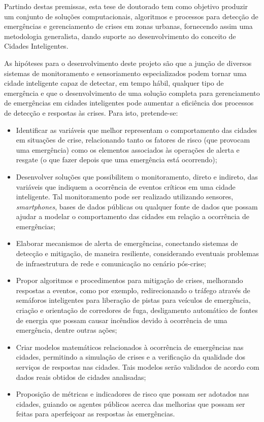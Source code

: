 \begin{refsection}
Partindo destas premissas, esta tese de doutorado tem como objetivo produzir um conjunto de soluções computacionais, algoritmos e processos para detecção de emergências e gerenciamento de crises em zonas urbanas, fornecendo assim uma metodologia generalista, dando suporte ao desenvolvimento do conceito de Cidades Inteligentes.

As hipóteses para o desenvolvimento deste projeto são que a junção de diversos sistemas de monitoramento e sensoriamento especializados podem tornar uma cidade inteligente capaz de detectar, em tempo hábil, qualquer tipo de emergência e que o desenvolvimento de uma solução completa para gerenciamento de emergências em cidades inteligentes pode aumentar a eficiência dos processos de detecção e respostas às crises. Para isto, pretende-se:

\begin{itemize}
  \item Identificar as variáveis que melhor representam o comportamento das cidades em situações de crise, relacionando tanto os fatores de risco (que provocam uma emergência) como os elementos associados às operações de alerta e resgate (o que fazer depois que uma emergência está ocorrendo);
  \item Desenvolver soluções que possibilitem o monitoramento, direto e indireto, das variáveis que indiquem a ocorrência de eventos críticos em uma cidade inteligente. Tal monitoramento pode ser realizado utilizando sensores, \textit{smartphones}, bases de dados públicas ou qualquer fonte de dados que possam ajudar a modelar o comportamento das cidades em relação a ocorrência de emergências;
  \item Elaborar mecanismos de alerta de emergências, conectando sistemas de detecção e mitigação, de maneira resiliente, considerando eventuais problemas de infraestrutura de rede e comunicação no cenário pós-crise;
  \item Propor algoritmos e procedimentos para mitigação de crises, melhorando respostas a eventos, como por exemplo, redirecionando o tráfego através de semáforos inteligentes para liberação de pistas para veículos de emergência, criação e orientação de corredores de fuga, desligamento automático de fontes de energia que possam causar incêndios devido à ocorrência de uma emergência, dentre outras ações;
  \item Criar modelos matemáticos relacionados à ocorrência de emergências nas cidades, permitindo a simulação de crises e a verificação da qualidade dos serviços de respostas nas cidades. Tais modelos serão validados de acordo com dados reais obtidos de cidades analisadas;
  \item Proposição de métricas e indicadores de risco que possam ser adotados nas cidades, guiando os agentes públicos acerca das melhorias que possam ser feitas para aperfeiçoar as respostas às emergências.
\end{itemize}


\end{refsection}
